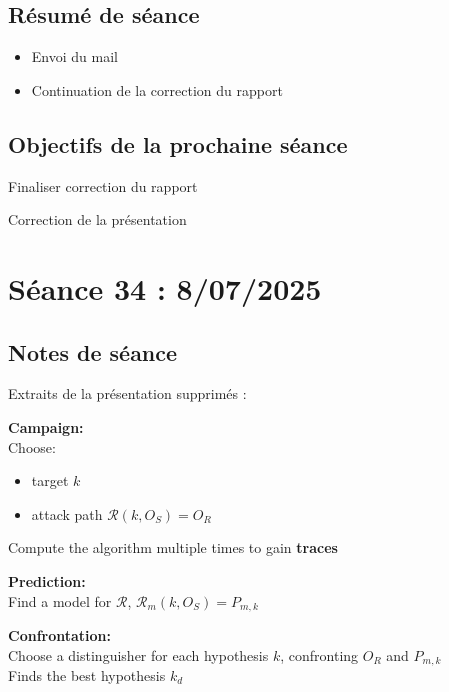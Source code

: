 \documentclass[12pt]{article}
\newcommand{\cmark}{\ding{51}}%
\newcommand{\done}{\rlap{$\square$}{\raisebox{2pt}{\large\hspace{1pt}\cmark}}%
	\hspace{-2.5pt}}
\begin{document}
	\subsection{Résumé de séance}
	\begin{itemize}
		\item Envoi du mail
		\item Continuation de la correction du rapport
	\end{itemize}
	
	\subsection{Objectifs de la prochaine séance}
	\begin{todolist}
		\item[\done] Finaliser correction du rapport
		\item[\done] Correction de la présentation
	\end{todolist}
	
	
	\section{Séance 34 : 8/07/2025}
	\subsection{Notes de séance}
	Extraits de la présentation supprimés :
	
%		
			\textbf{Campaign:}\\
			Choose:
			\begin{itemize}
				\item target $k$
				\item attack path $\mathcal{R}(k,O_S)=O_R$
			\end{itemize}
			Compute the algorithm multiple times to gain \textbf{traces}
			
			\textbf{Prediction:}\\
			Find a model for $\mathcal{R}$, $\mathcal{R}_m(k,O_S) = P_{m,k}$
			
			\textbf{Confrontation:}\\
			Choose a distinguisher for each hypothesis $k$, confronting $O_R$ and $P_{m,k}$\\
			Finds the best hypothesis $k_d$
	
\end{document}
